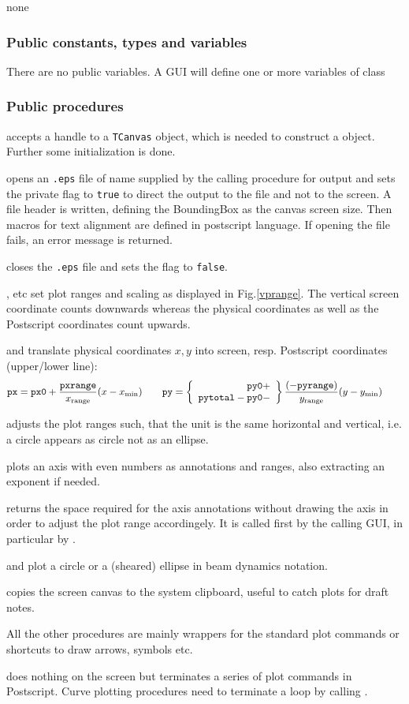 \documentclass[12pt]{article}
\newcommand\code[1]{{\tt #1}}
\newcommand\guifco[1]{{\color{violet}\code{#1}}}
\newcommand{\opaguif}[1]{\colorbox{violet!30}{{\color{black}\code{#1}}}}
\newcommand{\oguif}[1]{\hyperref[#1]{\opaguif{#1}}}
\newcommand{\uses}[1]{\flushleft {\bf Uses:} #1}
\newcommand{\pvar}[1]{\subsubsection*{Public constants, types and variables} #1}
\newcommand{\ppro}[1]{\subsubsection*{Public procedures} #1}
\begin{document}
\uses{none}

\pvar{
There are no public variables. A GUI will define one or more variables of class \guifco{Vplot}
}

\ppro{
\guifco{Create} accepts a handle to a \code{TCanvas} object, which is needed to construct a \guifco{Vplot} object. Further some initialization is done.

\guifco{PS\_start} opens an \code{*.eps} file of name \guifco{psfile} supplied by the calling procedure for output and sets the private flag \guifco{PS} to \code{true} to direct the output to the file and not to the screen. A file header is written, defining the BoundingBox as the canvas screen size. Then macros for text alignment are defined in postscript language. If opening the file fails, an error message is returned.

\guifco{PS\_stop} closes the \code{*.eps} file and sets the flag \guifco{PS} to \code{false}.

\guifco{SetRange*}, \guifco{SetMargin*} etc set plot ranges and scaling as displayed in Fig.\ref{vprange}. The vertical screen coordinate counts downwards whereas the physical coordinates as well as the Postscript coordinates count upwards. 

\guifco{getpx,getpy} and \guifco{PS\_getpxr,PS\_getpyr} translate physical coordinates $x,y$ into screen, resp. Postscript coordinates (upper/lower line):
\[
{\tt px}={\tt px0}+\frac{\tt pxrange}{x_{\rm range}} (x-x_{\rm min}) \qquad
{\tt py}=\left\{ \begin{array}{r} {\tt py0} + \\ {\tt pytotal} - {\tt py0} -  \end{array} \right\} \frac{(-{\tt pyrange})}{y_{\rm range}} (y-y_{\rm min}) \qquad
\]

\guifco{AdjustAspectRatio} adjusts the plot ranges such, that the unit is the same horizontal and vertical, i.e. a circle appears as circle not as an ellipse.

\guifco{Axis} plots an axis with even numbers as annotations and ranges, also extracting an exponent if needed. 

\guifco{GetAxisSpace} returns the space required for the axis annotations without drawing the axis in order to adjust the plot range accordingely. It is called first by the calling GUI, in particular by \oguif{../com/asfigure}.

\guifco{Circle} and \guifco{Ellipse} plot a circle or a (sheared) ellipse in beam dynamics notation.

\guifco{GrabImage} copies the screen canvas to the system clipboard, useful to catch plots for draft notes.

All the other procedures are mainly wrappers for the standard plot commands or shortcuts to draw arrows, symbols etc.

\guifco{Stroke} does nothing on the screen but terminates a series of plot commands in Postscript. Curve plotting procedures need to terminate a \guifco{LineTo...} loop by calling \guifco{stroke}.
}
\end{document}
